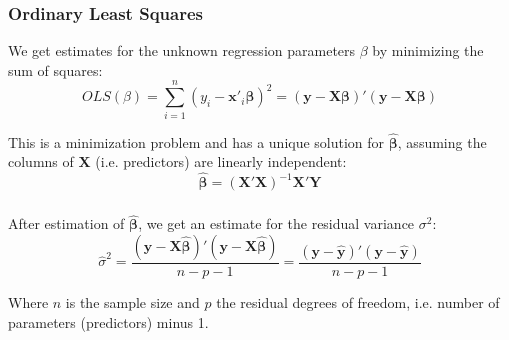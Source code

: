 \documentclass{beamer}
\newenvironment{VerbatimIN}
 {\VerbatimEnvironment
  \begin{tcolorbox}[
    breakable,
    colback=lightgray,
    spartan
  ]%
  \begin{Verbatim}}
 {\end{Verbatim}\end{tcolorbox}}
\newenvironment{VerbatimOUT}
 {\VerbatimEnvironment
  \begin{tcolorbox}[
    breakable,
    spartan
  ]%
  \begin{Verbatim}}
 {\end{Verbatim}\end{tcolorbox}}
\begin{document}
\begin{frame}
    \frametitle{Ordinary Least Squares}
    We get estimates for the unknown regression parameters $\beta$ by minimizing the sum of squares:
    \begin{equation*}
        OLS(\beta) = \sum_{i=1}^{n} (y_i - \mathbf{x}'_i \mathbf{\beta})^2 = (\mathbf{y} - \mathbf{X \beta})'(\mathbf{y} - \mathbf{X \beta})
    \end{equation*}
    \vspace{0.5cm}
    
    This is a minimization problem and has a unique solution for $\mathbf{\hat{\beta}}$, assuming the columns of $\mathbf{X}$ (i.e. predictors) are linearly independent:
    \begin{equation*}
        \mathbf{\hat{\beta}} = (\mathbf{X}'\mathbf{X})^{-1} \mathbf{X}'\mathbf{Y}
    \end{equation*}
\end{frame}

\begin{frame}
    \frametitle{}
    After estimation of $\mathbf{\hat{\beta}}$, we get an estimate for the residual variance $\sigma^2$:
    \begin{equation*}
        \hat{\sigma}^2 = \frac{(\mathbf{y} - \mathbf{X} \mathbf{\hat{\beta}})' (\mathbf{y} - \mathbf{X} \mathbf{\hat{\beta}})}{n-p-1} = \frac{(\mathbf{y} - \hat{\mathbf{y}})' (\mathbf{y} - \hat{\mathbf{y}})}{n-p-1}
    \end{equation*}
\end{frame}

Where $n$ is the sample size and $p$ the residual degrees of freedom, i.e. number of parameters (predictors) minus 1.

\end{document}
